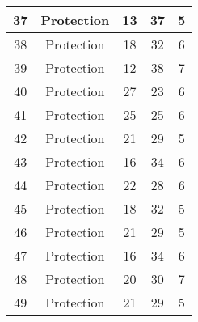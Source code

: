 \documentclass[results.tex]{subfiles}
\begin{document}
\begin{center}
\begin{tabular}{| c || c | c | c | c |}
            \hline
            37                      & Protection                   & 13                     & 37                      & 5                    \\
            \hline
            38                      & Protection                   & 18                     & 32                      & 6                    \\
            \hline
            39                      & Protection                   & 12                     & 38                      & 7                    \\
            \hline
            40                      & Protection                   & 27                     & 23                      & 6                    \\
            \hline
            41                      & Protection                   & 25                     & 25                      & 6                    \\
            \hline
            42                      & Protection                   & 21                     & 29                      & 5                    \\
            \hline
            43                      & Protection                   & 16                     & 34                      & 6                    \\
            \hline
            44                      & Protection                   & 22                     & 28                      & 6                    \\
            \hline
            45                      & Protection                   & 18                     & 32                      & 5                    \\
            \hline
            46                      & Protection                   & 21                     & 29                      & 5                    \\
            \hline
            47                      & Protection                   & 16                     & 34                      & 6                    \\
            \hline
            48                      & Protection                   & 20                     & 30                      & 7                    \\
            \hline
            49                      & Protection                   & 21                     & 29                      & 5                    \\
            \hline
        \end{tabular}
    \end{center}
\end{document}

